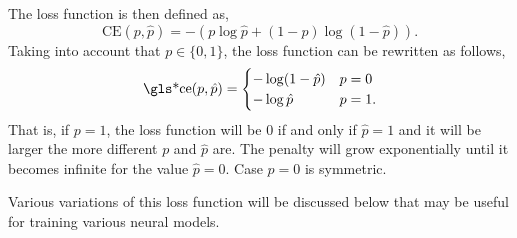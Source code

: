 The loss function is then defined as,
\begin{equation}
  \text{CE}(p, \hat{p}) = -(p\log\hat{p} + (1 - p)\log(1 - \hat{p})).
\end{equation}
Taking into account that \(p \in \{0, 1\}\), the loss function can be rewritten
as follows,
\begin{equation}
  \text{\gls*{ce}}(p, \hat{p}) =
  \begin{cases}
    -\log(1 - \hat{p}) & p = 0 \\
    -\log\hat{p} & p = 1.
  \end{cases}
\end{equation}
That is, if \(p = 1\), the loss function will be \(0\) if and only if
\(\hat{p} = 1\) and it will be larger the more different \(p\) and \(\hat{p}\)
are. The penalty will grow exponentially until it becomes infinite for the
value \(\hat{p} = 0\). Case \(p = 0\) is symmetric.

Various variations of this loss function will be discussed below that may be
useful for training various neural models.

